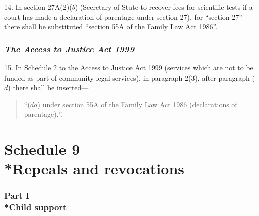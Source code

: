 \documentclass[12pt,a4paper]{article}
\begin{document}
\medskip

14. In section 27A(2)($b$)  (Secretary of State to recover fees for scientific tests if a court has made a declaration of parentage under section 27), for “section 27” there shall be substituted “section 55A of the Family Law Act 1986”.

\section*{\itshape The Access to Justice Act 1999}

15. In Schedule 2 to the Access to Justice Act 1999 (services which are not to be funded as part of community legal services), in paragraph 2(3), after paragraph ($d$)  there shall be inserted—
\begin{quotation}
“($da$) under section 55A of the Family Law Act 1986 (declarations of parentage),”.
\end{quotation}

\part[Schedule 9 --- Repeals and revocations]{Schedule 9\\*Repeals and revocations}

\renewcommand\parthead{--- Schedule 9}

\section[Part I --- Child support]{Part I\\*Child support}

\renewcommand\parthead{--- Schedule 9 Part I}
\end{document}
